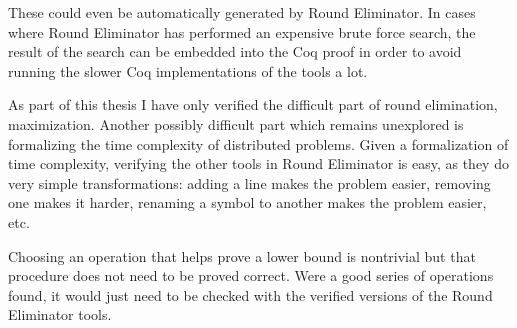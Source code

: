 \documentclass[english, 12pt, a4paper, sci, a-1b, online]{aaltothesis}
\begin{document}
These could even be automatically generated by Round Eliminator. In cases where Round Eliminator has performed an expensive brute force search, the result of the search can be embedded into the Coq proof in order to avoid running the slower Coq implementations of the tools a lot.

As part of this thesis I have only verified the difficult part of round elimination, maximization. Another possibly difficult part which remains unexplored is formalizing the time complexity of distributed problems. Given a formalization of time complexity, verifying the other tools in Round Eliminator is easy, as they do very simple transformations: adding a line makes the problem easier, removing one makes it harder, renaming a symbol to another makes the problem easier, etc.

Choosing an operation that helps prove a lower bound is nontrivial but that procedure does not need to be proved correct. Were a good series of operations found, it would just need to be checked with the verified versions of the Round Eliminator tools.

\clearpage
\thesisbibliography{}



\end{document}
